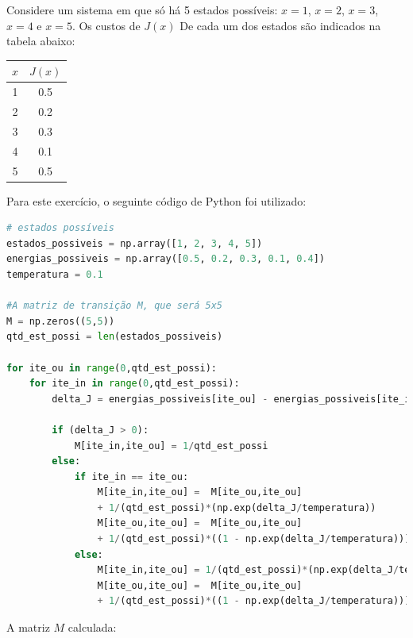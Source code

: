 \documentclass{homeworkclass}
\begin{document}
\begin{homeworkProblem}
Considere um sistema em que só há 5 estados possíveis: $x = 1$, $x = 2$, $x = 3$, $x = 4$ e $x = 5$. Os custos de $J(x)$ De cada um dos estados são indicados na tabela abaixo:

\begin{center}
	\begin{tabular}{|c|c|}
		\hline
		$x$ & $J(x)$ \\
		\hline
		1 & 0.5 \\
		\hline
		2 & 0.2 \\
		\hline
		3 & 0.3 \\
		\hline
		4 & 0.1 \\
		\hline
		5 & 0.5 \\
		\hline
	\end{tabular}
\end{center}

\begin{homeworkSection}[a) Considere um processo de Markov gerado pela aplicação do algoritmo de Metropolis aos dados da tabela acima, com temperatura fixa $T = 0.1$. Calcule a matriz de transição $M$ que define o processo de $X(t)$. Obs: note que o estado $X(t)$ é unidimensional, e portanto a matriz $M$ é $5 \times 5$.]

Para este exercício, o seguinte código de Python foi utilizado:

\begin{lstlisting}[language=Python]
# estados possíveis
estados_possiveis = np.array([1, 2, 3, 4, 5])
energias_possiveis = np.array([0.5, 0.2, 0.3, 0.1, 0.4])
temperatura = 0.1

#A matriz de transição M, que será 5x5
M = np.zeros((5,5))
qtd_est_possi = len(estados_possiveis)

for ite_ou in range(0,qtd_est_possi):
	for ite_in in range(0,qtd_est_possi):
		delta_J = energias_possiveis[ite_ou] - energias_possiveis[ite_in]

		if (delta_J > 0):
			M[ite_in,ite_ou] = 1/qtd_est_possi
		else:
			if ite_in == ite_ou:
				M[ite_in,ite_ou] =  M[ite_ou,ite_ou]
				+ 1/(qtd_est_possi)*(np.exp(delta_J/temperatura))
				M[ite_ou,ite_ou] =  M[ite_ou,ite_ou]
				+ 1/(qtd_est_possi)*((1 - np.exp(delta_J/temperatura)))
			else:
				M[ite_in,ite_ou] = 1/(qtd_est_possi)*(np.exp(delta_J/temperatura))
				M[ite_ou,ite_ou] =  M[ite_ou,ite_ou]
				+ 1/(qtd_est_possi)*((1 - np.exp(delta_J/temperatura)))
\end{lstlisting}

A matriz $M$ calculada:


\end{homeworkSection}
\end{homeworkProblem}
\end{document}
